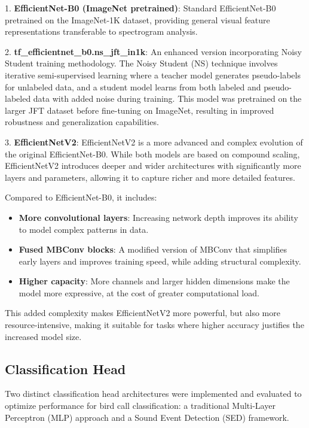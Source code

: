 \documentclass[ERTS, 2025]{ERTS}
\begin{document}
1. \textbf{EfficientNet-B0 (ImageNet pretrained)}: Standard EfficientNet-B0 pretrained on the ImageNet-1K dataset, providing general visual feature representations transferable to spectrogram analysis.

2. \textbf{tf\_efficientnet\_b0.ns\_jft\_in1k}: An enhanced version incorporating Noisy Student training methodology. The Noisy Student (NS) technique involves iterative semi-supervised learning where a teacher model generates pseudo-labels for unlabeled data, and a student model learns from both labeled and pseudo-labeled data with added noise during training. This model was pretrained on the larger JFT dataset before fine-tuning on ImageNet, resulting in improved robustness and generalization capabilities.

3. \textbf{EfficientNetV2}:  
EfficientNetV2 is a more advanced and complex evolution of the original EfficientNet-B0. While both models are based on compound scaling, EfficientNetV2 introduces deeper and wider architectures with significantly more layers and parameters, allowing it to capture richer and more detailed features.

Compared to EfficientNet-B0, it includes:
\begin{itemize}
    \item \textbf{More convolutional layers}: Increasing network depth improves its ability to model complex patterns in data.
    \item \textbf{Fused MBConv blocks}: A modified version of MBConv that simplifies early layers and improves training speed, while adding structural complexity.
    \item \textbf{Higher capacity}: More channels and larger hidden dimensions make the model more expressive, at the cost of greater computational load.
\end{itemize}

This added complexity makes EfficientNetV2 more powerful, but also more resource-intensive, making it suitable for tasks where higher accuracy justifies the increased model size.

\subsection{Classification Head}
Two distinct classification head architectures were implemented and evaluated to optimize performance for bird call classification: a traditional Multi-Layer Perceptron (MLP) approach and a Sound Event Detection (SED) framework.
\end{document}
